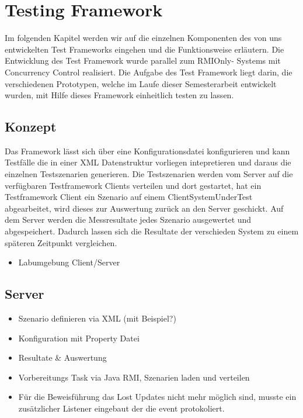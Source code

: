 \section{Testing Framework}
\label{sec:testing Framework}
Im folgenden Kapitel werden wir auf die einzelnen Komponenten des von uns entwickelten Test Frameworks eingehen und die Funktionsweise erläutern. Die Entwicklung des Test Framework wurde parallel zum RMIOnly- Systems mit Concurrency Control realisiert. Die Aufgabe des Test Framework liegt darin, die verschiedenen Prototypen, welche im Laufe dieser Semesterarbeit entwickelt wurden, mit Hilfe dieses Framework einheitlich testen zu lassen.


\subsection{Konzept}
Das Framework lässt sich über eine Konfigurationsdatei konfigurieren und kann Testfälle die in einer XML Datenstruktur vorliegen intepretieren und daraus die einzelnen Testszenarien generieren. Die Testszenarien werden vom Server auf die verfügbaren Testframework Clients verteilen und dort gestartet, hat ein Testframework Client ein Szenario auf einem ClientSystemUnderTest abgearbeitet, wird dieses zur Auswertung zurück an den Server geschickt. Auf dem Server werden die Messresultate jedes Szenario ausgewertet und abgespeichert. Dadurch lassen sich die Resultate der verschieden System zu einem späteren Zeitpunkt vergleichen.

\begin{itemize}
\item Labumgebung \/ Client/Server
\end{itemize}


\subsection{Server}
\label{sec:test-FW Server}
\begin{itemize}
\item Szenario definieren via XML (mit Beispiel?)
\item Konfiguration mit Property Datei
\item Resultate \& Auswertung
\item Vorbereitungs Task via Java RMI, Szenarien laden und verteilen
\item Für die Beweisführung das Lost Updates nicht mehr möglich sind, musste ein zusätzlicher Listener eingebaut der die event protokoliert.
\end{itemize}

